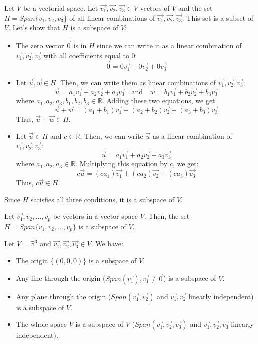 \begin{eg}
    Let $V$ be a vectorial space. Let $\vec{v_1}, \vec{v_2}, \vec{v_3} \in V$ vectors of $V$ and the set $H = Span\{v_1,v_2,v_3\}$ of all linear combinations of $\vec{v_1}, \vec{v_2}, \vec{v_3}$. This set is a subset of $V$. Let's show that $H$ is a subspace of $V$:
    \begin{itemize}[itemsep=1pt,label=$\circ$]
        \item The zero vector $\vec{0}$ is in $H$ since we can write it as a linear combination of $\vec{v_1}, \vec{v_2}, \vec{v_3}$ with all coefficients equal to $0$:
        \[ \vec{0} = 0\vec{v_1} + 0\vec{v_2} + 0\vec{v_3} \]
        \item Let $\vec{u}, \vec{w} \in H$. Then, we can write them as linear combinations of $\vec{v_1}, \vec{v_2}, \vec{v_3}$:
        \[ \vec{u} = a_1\vec{v_1} + a_2\vec{v_2} + a_3\vec{v_3} \quad \text{and} \quad \vec{w} = b_1\vec{v_1} + b_2\vec{v_2} + b_3\vec{v_3} \]
        where $a_1, a_2, a_3, b_1, b_2, b_3 \in \mathbb{R}$. Adding these two equations, we get:
        \[ \vec{u} + \vec{w} = (a_1 + b_1)\vec{v_1} + (a_2 + b_2)\vec{v_2} + (a_3 + b_3)\vec{v_3} \]
        Thus, $\vec{u} + \vec{w} \in H$.
        \item Let $\vec{u} \in H$ and $c \in \mathbb{R}$. Then, we can write $\vec{u}$ as a linear combination of $\vec{v_1}, \vec{v_2}, \vec{v_3}$:
        \[ \vec{u} = a_1\vec{v_1} + a_2\vec{v_2} + a_3\vec{v_3} \]
        where $a_1, a_2, a_3 \in \mathbb{R}$. Multiplying this equation by $c$, we get:
        \[ c\vec{u} = (ca_1)\vec{v_1} + (ca_2)\vec{v_2} + (ca_3)\vec{v_3} \]
        Thus, $c\vec{u} \in H$.
    \end{itemize}
    Since $H$ satisfies all three conditions, it is a subspace of $V$.
\end{eg}

\begin{theorem}
    Let $\vec{v_1}, v_2, \ldots, v_p$ be vectors in a vector space $V$. Then, the set $H = Span\{v_1, v_2, \ldots, v_p\}$ is a subspace of $V$.
\end{theorem}

\begin{eg}
    Let $V = \mathbb{R}^3$ and $\vec{v_1}, \vec{v_2}, \vec{v_3} \in V$. We have:
    \begin{itemize}
        \item The origin $\{(0,0,0)\}$ is a subspace of $V$.
        \item Any line through the origin ($Span(\vec{v_1}), \vec{v_1} \neq \vec{0}$) is a subspace of $V$.
        \item Any plane through the origin ($Span(\vec{v_1}, \vec{v_2})$ and $\vec{v_1}, \vec{v_2}$ linearly independent) is a subspace of $V$.
        \item The whole space $V$ is a subspace of $V$ ($Span(\vec{v_1}, \vec{v_2}, \vec{v_3})$ and $\vec{v_1}, \vec{v_2}, \vec{v_3}$ linearly independent).
    \end{itemize}
\end{eg}

